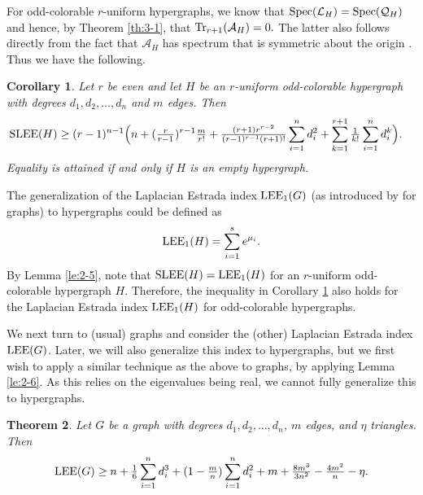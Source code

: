 \documentclass[11pt]{article}
\newtheorem{theorem}{Theorem}[section]
\newtheorem{corollary}[theorem]{Corollary}
\def\LEE{\mathop{\rm LEE }\nolimits}
\def\SLEE{\mathop{\rm SLEE }\nolimits}
\def\Tr{\mathop{\rm Tr }\nolimits}
\def\Spec{\mathop{\rm Spec }\nolimits}
\begin{document}
For odd-colorable $r$-uniform hypergraphs, we know that $\Spec(\mathcal{L}_{H})=\Spec(\mathcal{Q}_{H})$ and hence, by Theorem \ref{th:3-1}, that $\Tr_{r+1}(\mathcal{A}_{H})=0.$ The latter also follows directly from the fact that $\mathcal{A}_{H}$ has spectrum that is symmetric about the origin \cite{N}. Thus we have the following.

\noindent\begin{corollary}\label{co:4-2}
Let $r$ be even and let $H$ be an $r$-uniform odd-colorable hypergraph with degrees $d_{1}, d_{2} ,\ldots, d_{n}$ and $m$ edges. Then
\begin{align*}
\SLEE(H) \geq (r-1)^{n-1}&\Big(n+(\tfrac{r}{r-1})^{r-1}\tfrac{m}{r!}
+\tfrac{(r+1)r^{r-2}}{(r-1)^{r-1}(r+1)!}\sum\limits_{i=1}^{n}d_{i}^{2}+\sum\limits_{k=1}^{r+1}\tfrac{1}{k!}\sum\limits_{i=1}^{n}d_{i}^{k}\Big).
\end{align*}
Equality is attained if and only if $H$ is an empty hypergraph.
\end{corollary}

The generalization of the Laplacian Estrada index $\LEE_{1}(G)$ (as introduced by \cite{FAG} for graphs) to hypergraphs could be defined as $$\LEE_{1}(H)= \sum_{i=1}^{s}e^{\mu_{i}}.$$ By Lemma \ref{le:2-5}, note that $\SLEE(H)=\LEE_{1}(H)$ for an $r$-uniform odd-colorable hypergraph $H$. Therefore, the inequality in Corollary \ref{co:4-2} also holds for the Laplacian Estrada index $\LEE_{1}(H)$ for odd-colorable hypergraphs.

We next turn to (usual) graphs and consider the (other) Laplacian Estrada index $\LEE(G)$. Later, we will also generalize this index to hypergraphs, but we first wish to apply a similar technique as the above to graphs, by applying Lemma \ref{le:2-6}. As this relies on the eigenvalues being real, we cannot fully generalize this to hypergraphs.

\noindent\begin{theorem}\label{th:4-3}
Let $G$ be a graph with degrees $d_{1}, d_{2} ,\ldots, d_{n}$, $m$ edges, and $\eta$ triangles. Then
$$\LEE(G) \geq n+\tfrac{1}{6}\sum_{i=1}^{n}d_{i}^{3}+(1-\tfrac{m}{n})\sum_{i=1}^{n}d_{i}^{2}+m+\tfrac{8m^{3}}{3n^{2}}-\tfrac{4m^{2}}{n}-\eta.$$
\end{theorem}
\end{document}
